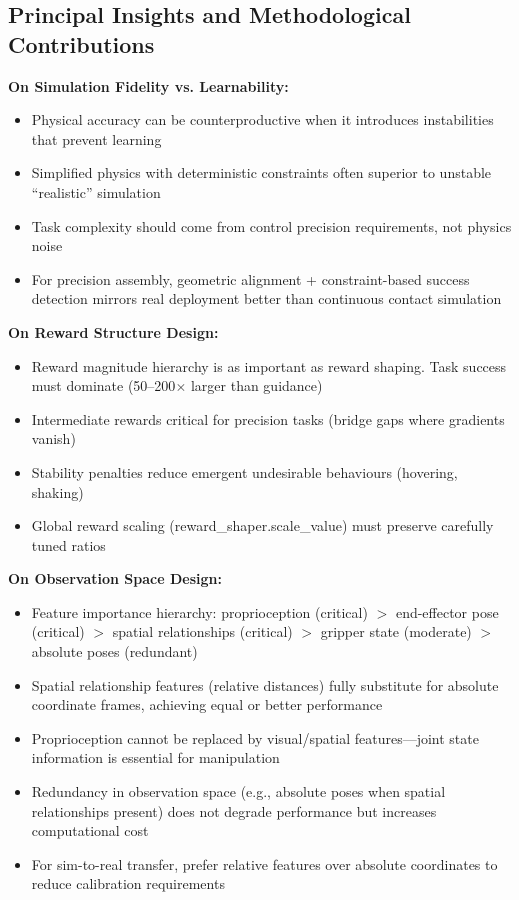 \documentclass[12pt,a4paper,oneside]{report}
\begin{document}
\subsection{Principal Insights and Methodological Contributions}

\textbf{On Simulation Fidelity vs. Learnability:}
\begin{itemize}
    \item Physical accuracy can be counterproductive when it introduces instabilities that prevent learning
    \item Simplified physics with deterministic constraints often superior to unstable ``realistic'' simulation
    \item Task complexity should come from control precision requirements, not physics noise
    \item For precision assembly, geometric alignment + constraint-based success detection mirrors real deployment better than continuous contact simulation
\end{itemize}

\textbf{On Reward Structure Design:}
\begin{itemize}
    \item Reward magnitude hierarchy is as important as reward shaping. Task success must dominate (50--200$\times$ larger than guidance)
    \item Intermediate rewards critical for precision tasks (bridge gaps where gradients vanish)
    \item Stability penalties reduce emergent undesirable behaviours (hovering, shaking)
    \item Global reward scaling (reward\_shaper.scale\_value) must preserve carefully tuned ratios
\end{itemize}

\textbf{On Observation Space Design:}
\begin{itemize}
    \item Feature importance hierarchy: proprioception (critical) $>$ end-effector pose (critical) $>$ spatial relationships (critical) $>$ gripper state (moderate) $>$ absolute poses (redundant)
    \item Spatial relationship features (relative distances) fully substitute for absolute coordinate frames, achieving equal or better performance
    \item Proprioception cannot be replaced by visual/spatial features---joint state information is essential for manipulation
    \item Redundancy in observation space (e.g., absolute poses when spatial relationships present) does not degrade performance but increases computational cost
    \item For sim-to-real transfer, prefer relative features over absolute coordinates to reduce calibration requirements
\end{itemize}
\end{document}
